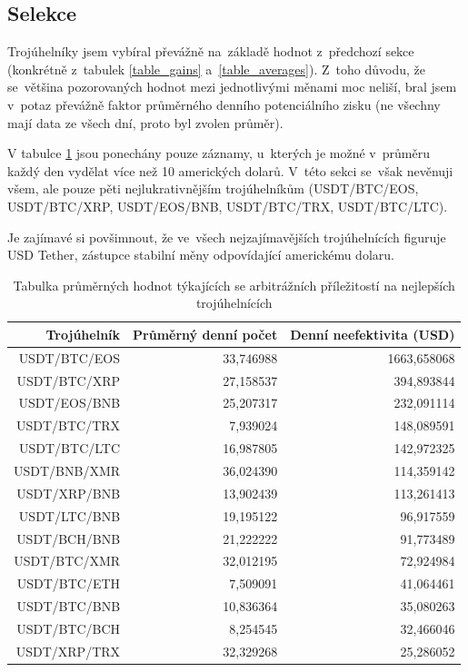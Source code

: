 \documentclass[thesis=B,czech]{FITthesis}[2019/03/21]
\begin{document}
\subsection{Selekce}
Trojúhelníky jsem vybíral převážně na~základě hodnot z~předchozí sekce \linebreak (konkrétně z~tabulek \ref{table_gains} a~\ref{table_averages}). Z~toho důvodu, že se~většina pozorovaných hodnot mezi jednotlivými měnami moc neliší, bral jsem v~potaz převážně faktor průměrného denního potenciálního zisku (ne všechny mají data ze všech dní, proto byl zvolen průměr).

V tabulce \ref{table_combined_best} jsou ponechány pouze záznamy, u~kterých je možné v~průměru každý den vydělat více než 10 amerických dolarů. V~této sekci se~však nevěnuji všem, ale pouze pěti nejlukrativnějším trojúhelníkům \linebreak (USDT/BTC/EOS, USDT/BTC/XRP, USDT/EOS/BNB, USDT/BTC/TRX, USDT/BTC/LTC).

Je zajímavé si povšimnout, že ve~všech nejzajímavějších trojúhelnících figuruje USD Tether, zástupce stabilní měny odpovídající americkému dolaru.


\begin{table}\centering
\caption{Tabulka průměrných hodnot týkajících se arbitrážních příležitostí na nejlepších trojúhelnících}
\label{table_combined_best}
\begin{tabular}{|| r | r | r ||}\hline Trojúhelník & Průměrný denní počet & Denní neefektivita (USD)\\ [0.5ex]
 \hline\hline USDT/BTC/EOS & 33,746988 & 1663,658068\\ 
 \hline USDT/BTC/XRP & 27,158537 & 394,893844\\ 
 \hline USDT/EOS/BNB & 25,207317 & 232,091114\\ 
 \hline USDT/BTC/TRX & 7,939024 & 148,089591\\ 
 \hline USDT/BTC/LTC & 16,987805 & 142,972325\\ 
 \hline USDT/BNB/XMR & 36,024390 & 114,359142\\ 
 \hline USDT/XRP/BNB & 13,902439 & 113,261413\\ 
 \hline USDT/LTC/BNB & 19,195122 & 96,917559\\ 
 \hline USDT/BCH/BNB & 21,222222 & 91,773489\\ 
 \hline USDT/BTC/XMR & 32,012195 & 72,924984\\ 
 \hline USDT/BTC/ETH & 7,509091 & 41,064461\\ 
 \hline USDT/BTC/BNB & 10,836364 & 35,080263\\ 
 \hline USDT/BTC/BCH & 8,254545 & 32,466046\\ 
 \hline USDT/XRP/TRX & 32,329268 & 25,286052\\ 
 \hline
\end{tabular}
\end{table}
\end{document}

